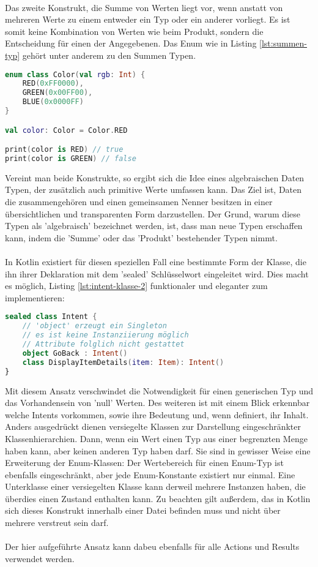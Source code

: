 \\
Das zweite Konstrukt, die Summe von Werten liegt vor, wenn anstatt von mehreren Werte zu einem entweder ein Typ oder ein anderer vorliegt. Es ist somit keine Kombination von Werten wie beim Produkt, sondern die Entscheidung für einen der Angegebenen. Das Enum wie in Listing
\ref{lst:summen-typ}
gehört unter anderem zu den Summen Typen.
\begin{lstlisting}[caption={Summen Typ}, label={lst:summen-typ}, language=Kotlin]
enum class Color(val rgb: Int) {
	RED(0xFF0000),
	GREEN(0x00FF00),
	BLUE(0x0000FF)
}

val color: Color = Color.RED

print(color is RED) // true
print(color is GREEN) // false
\end{lstlisting}
\bigskip
Vereint man beide Konstrukte, so ergibt sich die Idee eines algebraischen Daten Typen, der zusätzlich 
auch primitive Werte umfassen kann. Das Ziel ist, Daten die zusammengehören und einen gemeinsamen Nenner 
besitzen in einer übersichtlichen und transparenten Form darzustellen. Der Grund, warum diese Typen als 
'algebraisch' bezeichnet werden, ist, dass man neue Typen erschaffen kann, indem die 'Summe' oder das 
'Produkt' bestehender Typen nimmt.
\\
\\
In Kotlin existiert für diesen speziellen Fall eine bestimmte Form der Klasse, die ihn ihrer Deklaration mit dem 'sealed' Schlüsselwort eingeleitet wird. Dies macht es möglich, Listing 
\ref{lst:intent-klasse-2}
funktionaler und eleganter zum implementieren:
\begin{lstlisting}[caption={Intents als sealded class}, label={lst:intents-sealed-class}, language=Kotlin]
sealed class Intent {
	// 'object' erzeugt ein Singleton
	// es ist keine Instanziierung möglich
	// Attribute folglich nicht gestattet
	object GoBack : Intent()
	class DisplayItemDetails(item: Item): Intent()
}
\end{lstlisting}
\bigskip
Mit diesem Ansatz verschwindet die Notwendigkeit für einen generischen Typ und das Vorhandensein von 
'null' Werten. Des weiteren ist mit einem Blick erkennbar welche Intents vorkommen, sowie ihre Bedeutung 
und, wenn definiert, ihr Inhalt. Anders ausgedrückt dienen versiegelte Klassen zur Darstellung 
eingeschränkter Klassenhierarchien. Dann, wenn ein Wert einen Typ aus einer begrenzten Menge haben kann, 
aber keinen anderen Typ haben darf. Sie sind in gewisser Weise eine Erweiterung der Enum-Klassen: Der 
Wertebereich für einen Enum-Typ ist ebenfalls eingeschränkt, aber jede Enum-Konstante existiert nur 
einmal. Eine Unterklasse einer versiegelten Klasse kann derweil mehrere Instanzen haben, die überdies 
einen Zustand enthalten kann. Zu beachten gilt außerdem, das in Kotlin sich dieses Konstrukt innerhalb einer Datei befinden muss und nicht über mehrere verstreut sein darf.
\\\\
Der hier aufgeführte Ansatz kann dabeu ebenfalls für alle Actions und Results verwendet werden.
